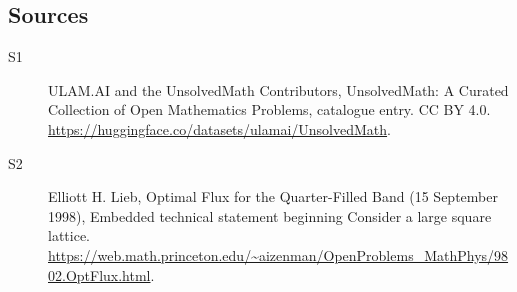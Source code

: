 \documentclass[11pt]{article}
\begin{document}
\subsection{Sources}
\begin{description}
\item[\hypertarget{source:statement:1}{S1}] ULAM.AI and the UnsolvedMath Contributors, UnsolvedMath: A Curated Collection of Open Mathematics Problems, catalogue entry. CC BY 4.0. \url{https://huggingface.co/datasets/ulamai/UnsolvedMath}.
\item[\hypertarget{source:statement:2}{S2}] Elliott H. Lieb, Optimal Flux for the Quarter-Filled Band (15 September 1998), Embedded technical statement beginning Consider a large square lattice. \url{https://web.math.princeton.edu/~aizenman/OpenProblems_MathPhys/9802.OptFlux.html}.
\end{description}
\label{end:statement}
\end{document}
